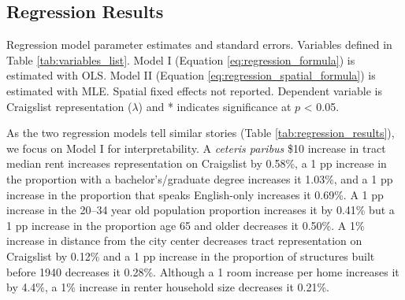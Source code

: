 \documentclass[11pt,letterpaper]{article}
\begin{document}
\subsection{Regression Results}

\begin{table}[tb]
	\centering
	\small
	\caption{Regression model parameter estimates and standard errors. Variables defined in Table \ref{tab:variables_list}. Model I (Equation \ref{eq:regression_formula}) is estimated with OLS. Model II (Equation \ref{eq:regression_spatial_formula}) is estimated with MLE. Spatial fixed effects not reported. Dependent variable is Craigslist representation ($\lambda$) and * indicates significance at $p$ < 0.05.}
	\label{tab:regression_results}
	
\end{table}

As the two regression models tell similar stories (Table \ref{tab:regression_results}), we focus on Model I for interpretability. A \textit{ceteris paribus} \$10 increase in tract median rent increases representation on Craigslist by 0.58\%, a 1 pp increase in the proportion with a bachelor's/graduate degree increases it 1.03\%, and a 1 pp increase in the proportion that speaks English-only increases it 0.69\%. A 1 pp increase in the 20--34 year old population proportion increases it by 0.41\% but a 1 pp increase in the proportion age 65 and older decreases it 0.50\%. A 1\% increase in distance from the city center decreases tract representation on Craigslist by 0.12\% and a 1 pp increase in the proportion of structures built before 1940 decreases it 0.28\%. Although a 1 room increase per home increases it by 4.4\%, a 1\% increase in renter household size decreases it 0.21\%.
\end{document}
